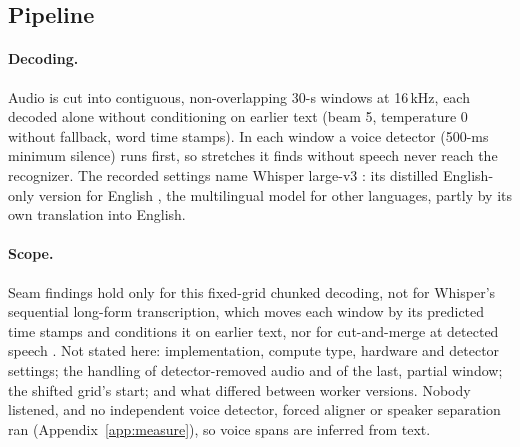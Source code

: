 
\subsection{Pipeline}
\label{sec:pipeline}

\paragraph{Decoding.} Audio is cut into contiguous, non-overlapping 30-s windows at 16\,kHz, each decoded alone without
conditioning on earlier text (beam 5, temperature 0 without fallback, word time stamps). In each window a voice detector
(500-ms minimum silence) runs first, so stretches it finds without speech never reach the recognizer. The recorded
settings name Whisper large-v3 \cite{radford2022robust}: its distilled English-only version for English
\cite{gandhi2023distilwhisper}, the multilingual model for other languages, partly by its own translation into
English.

\paragraph{Scope.} Seam findings hold only for this fixed-grid chunked decoding, not for Whisper's sequential
long-form transcription, which moves each window by its predicted time stamps and conditions it on earlier text, nor
for cut-and-merge at detected speech \cite{bain2023whisperx}. Not stated here: implementation, compute type, hardware and
detector settings; the handling of detector-removed audio and of the last, partial window; the shifted grid's start;
and what differed between worker versions. Nobody listened, and no independent voice detector, forced aligner or
speaker separation ran (Appendix~\ref{app:measure}), so voice spans are inferred from text.

